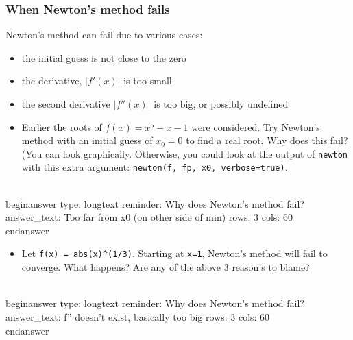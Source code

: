\documentclass[12pt]{article}
\begin{document}
\subsubsection{When Newton's method fails}\newline
Newton's method can fail due to various cases:\begin{itemize}\item the initial guess is not close to the zero\end{itemize}\begin{itemize}\item the derivative, $|f'(x)|$ is too small\end{itemize}\begin{itemize}\item the second derivative $|f''(x)|$ is too big, or possibly undefined\end{itemize}\begin{itemize}\item Earlier  the roots of $f(x) = x^5 - x - 1$ were considered. Try   Newton's method with an initial guess of $x_0=0$ to find a real   root. Why does this fail? (You can look graphically. Otherwise, you   could look at the output of \texttt{newton} with this extra argument:   \texttt{newton(f, fp, x0, verbose=true)}.\end{itemize}
\\begin{answer}
type: longtext
reminder: Why does Newton's method fail?
answer_text: Too far from x0 (on other side of min) 
rows: 3
cols: 60
\\end{answer}
\begin{itemize}\item Let \texttt{f(x) = abs(x)^(1/3)}. Starting at \texttt{x=1}, Newton's method will   fail to converge. What happens? Are any of the above 3 reason's to   blame?\end{itemize}
\\begin{answer}
type: longtext
reminder: Why does Newton's method fail?
answer_text: f'' doesn't exist, basically too big 
rows: 3
cols: 60
\\end{answer}
\end{document}
